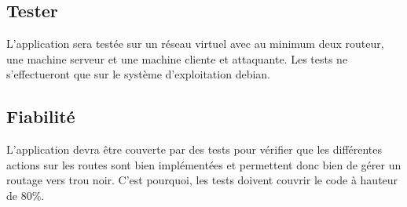 \subsection{Tester}
L'application sera testée sur un réseau virtuel avec au minimum deux routeur, une machine serveur et une machine cliente et attaquante. Les tests ne s'effectueront que sur le système d'exploitation debian.

\subsection{Fiabilité}
L'application devra être couverte par des tests pour vérifier que les différentes actions sur les routes sont bien implémentées et permettent donc bien de gérer un routage vers trou noir. C'est pourquoi, les tests doivent couvrir le code à hauteur de 80\%. %



